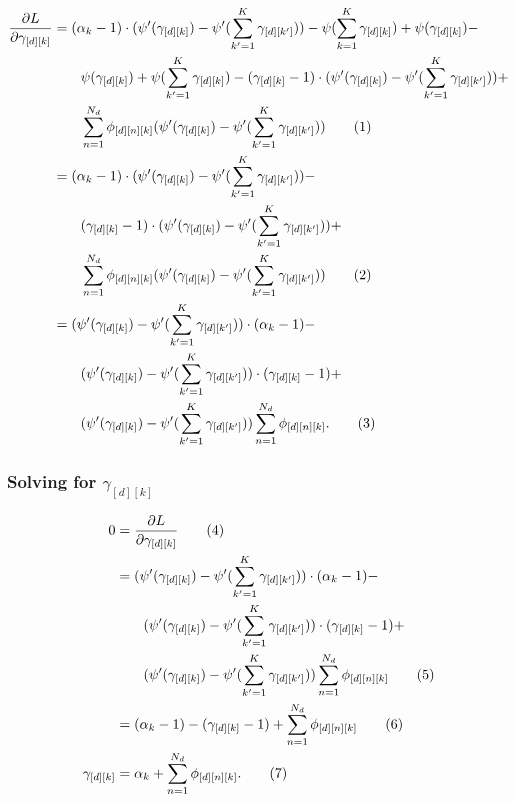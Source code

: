 \documentclass[12pt]{article}
\newcommand\numberthis{\addtocounter{equation}{1}\tag{\theequation}}
\begin{document}
\begin{align*}
    \frac{\partial L}{\partial \gamma_{[d][k]}}
    &=
    (\alpha_{k} - 1) \cdot (\psi'(\gamma_{[d][k]}) - \psi'(\sum_{k'=1}^{K}
    \gamma_{[d][k']})) - \psi(\sum_{k=1}^{K} \gamma_{[d][k]}) +
    \psi(\gamma_{[d][k]}) -
    \\* & \quad\quad \psi(\gamma_{[d][k]}) + \psi(\sum_{k'=1}^{K}
    \gamma_{[d][k]}) -
    (\gamma_{[d][k]} - 1) \cdot (\psi'(\gamma_{[d][k]}) - \psi'(\sum_{k'=1}^{K}
    \gamma_{[d][k']})) +
    \\* & \quad\quad \sum_{n=1}^{N_{d}} \phi_{[d][n][k]} (\psi'(\gamma_{[d][k]})
    - \psi'(\sum_{k'=1}^{K} \gamma_{[d][k']}))
    \numberthis
    \\ &=
    (\alpha_{k} - 1) \cdot (\psi'(\gamma_{[d][k]}) - \psi'(\sum_{k'=1}^{K}
    \gamma_{[d][k']})) -
    \\* & \quad\quad
    (\gamma_{[d][k]} - 1) \cdot (\psi'(\gamma_{[d][k]}) - \psi'(\sum_{k'=1}^{K}
    \gamma_{[d][k']})) +
    \\* & \quad\quad \sum_{n=1}^{N_{d}} \phi_{[d][n][k]} (\psi'(\gamma_{[d][k]})
    - \psi'(\sum_{k'=1}^{K} \gamma_{[d][k']}))
    \numberthis
    \\ &=
    (\psi'(\gamma_{[d][k]}) - \psi'(\sum_{k'=1}^{K}
    \gamma_{[d][k']})) \cdot (\alpha_{k} - 1) -
    \\* & \quad\quad
    (\psi'(\gamma_{[d][k]}) - \psi'(\sum_{k'=1}^{K}
    \gamma_{[d][k']})) \cdot (\gamma_{[d][k]} - 1) +
    \\* & \quad\quad (\psi'(\gamma_{[d][k]})
    - \psi'(\sum_{k'=1}^{K} \gamma_{[d][k']}))
    \sum_{n=1}^{N_{d}} \phi_{[d][n][k]}.
    \numberthis
\end{align*}

\subsubsection{Solving for $\gamma_{[d][k]}$}

\begin{align*}
    0 &= \frac{\partial L}{\partial \gamma_{[d][k]}} \numberthis
    \\ &=
    (\psi'(\gamma_{[d][k]}) - \psi'(\sum_{k'=1}^{K}
    \gamma_{[d][k']})) \cdot (\alpha_{k} - 1) -
    \\* & \quad\quad
    (\psi'(\gamma_{[d][k]}) - \psi'(\sum_{k'=1}^{K}
    \gamma_{[d][k']})) \cdot (\gamma_{[d][k]} - 1) +
    \\* & \quad\quad (\psi'(\gamma_{[d][k]})
    - \psi'(\sum_{k'=1}^{K} \gamma_{[d][k']}))
    \sum_{n=1}^{N_{d}} \phi_{[d][n][k]}
    \numberthis
    \\ &=
    (\alpha_{k} - 1) -
    (\gamma_{[d][k]} - 1) + \sum_{n=1}^{N_{d}} \phi_{[d][n][k]}
    \numberthis
    \\*
    \gamma_{[d][k]} &= \alpha_{k} + \sum_{n=1}^{N_{d}} \phi_{[d][n][k]}.
    \numberthis\label{eq:gammaupdate}
\end{align*}
\end{document}
